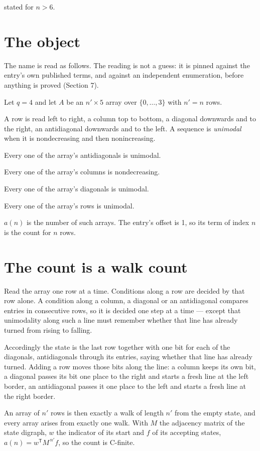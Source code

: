 \documentclass[11pt]{article}
\theoremstyle{definition}
\begin{document}
stated for $n > 6$.

\section{The object}

The name is read as follows. The reading is not a guess: it is pinned against the entry's own published terms, and against an independent enumeration, before anything is proved (Section 7).

Let $q = 4$ and let $A$ be an $n' \times 5$ array over $\{0,\dots,3\}$ with $n' = n$ rows.

A row is read left to right, a column top to bottom, a diagonal downwards and to the right, an antidiagonal downwards and to the left. A sequence is {\itshape unimodal} when it is nondecreasing and then nonincreasing.

Every one of the array's antidiagonals is unimodal.

Every one of the array's columns is nondecreasing.

Every one of the array's diagonals is unimodal.

Every one of the array's rows is unimodal.

$a(n)$ is the number of such arrays. The entry's offset is 1, so its term of index $n$ is the count for $n$ rows.

\section{The count is a walk count}

Read the array one row at a time. Conditions along a row are decided by that row alone. A condition along a column, a diagonal or an antidiagonal compares entries in consecutive rows, so it is decided one step at a time --- except that unimodality along such a line must remember whether that line has already turned from rising to falling.

Accordingly the state is the last row together with one bit for each of the diagonals, antidiagonals through its entries, saying whether that line has already turned. Adding a row moves those bits along the line: a column keeps its own bit, a diagonal passes its bit one place to the right and starts a fresh line at the left border, an antidiagonal passes it one place to the left and starts a fresh line at the right border.

An array of $n'$ rows is then exactly a walk of length $n'$ from the empty state, and every array arises from exactly one walk. With $M$ the adjacency matrix of the state digraph, $w$ the indicator of its start and $f$ of its accepting states, $a(n) = w^{\mathsf T}M^{\,n'}f$, so the count is C-finite.
\end{document}
